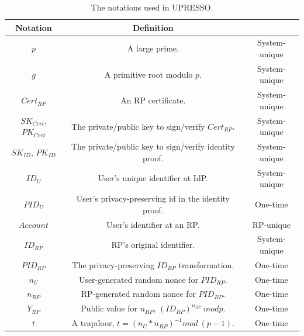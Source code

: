 \begin{table}[tb]
    \caption{The notations used in UPRESSO.}
    \centering
    \begin{tabular}{|c|c|c|}
    \hline
    {Notation} & {Definition} & {} \\
    \hline
    {$p$} & {A large prime.} & {System-unique} \\
    \hline
    {$g$} & {A primitive root  modulo $p$. } & {System-unique} \\
    \hline
    {$Cert_{RP}$} & {An RP certificate. } & {System-unique} \\
    \hline
    {$SK_{Cert}$, $PK_{Cert}$} & {The private/public key to sign/verify $Cert_{RP}$. } & {System-unique} \\
    \hline
    {$SK_{ID}$, $PK_{ID}$} & {The private/public key to sign/verify identity proof.} & {System-unique} \\
    \hline
    {$ID_U$} & {User's unique identifier at IdP.} & {System-unique} \\
    \hline
    {$PID_U$} & {User's privacy-preserving id in the identity proof.} & {One-time}\\
    \hline
    {$Account$} & {User's identifier at an RP.} & {RP-unique} \\
    \hline
    {$ID_{RP}$} & {RP's original identifier.} & {System-unique} \\
    \hline
    {$PID_{RP}$} & {The privacy-preserving $ID_{RP}$ transformation.} & {One-time} \\
    \hline
    {$n_U$} & {User-generated random nonce for $PID_{RP}$.} & {One-time} \\
    \hline
    {$n_{RP}$} & {RP-generated random nonce for $PID_{RP}$.} & {One-time} \\
    \hline
    {$Y_{RP}$} & {Public value for $n_{RP}$, $(ID_{RP})^{n_{RP}} \ mod p$.} & {One-time} \\
    \hline
    {$t$} & {A trapdoor, $t=(n_U*n_{RP})^{-1} mod \ (p-1)$.} & {One-time} \\
    \hline
    \end{tabular}
    \label{tbl:notations}
\end{table}

